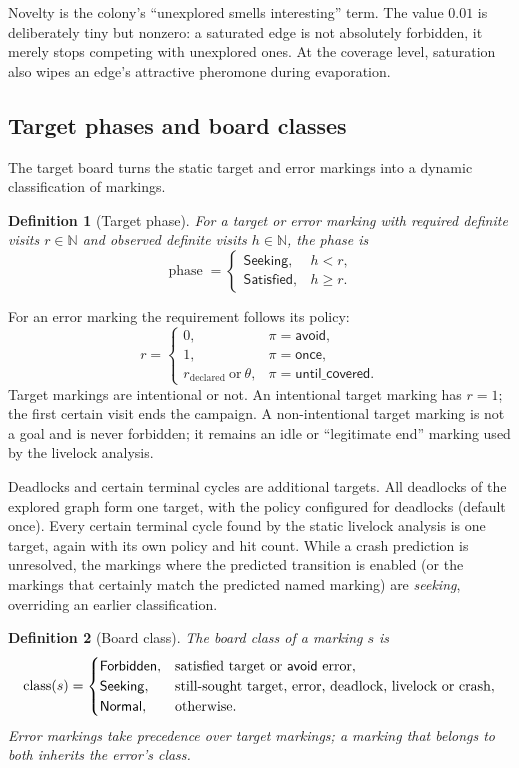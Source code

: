 \documentclass[11pt,a4paper]{article}
\newtheorem{definition}{Definition}[section]
\newcommand{\N}{\mathbb{N}}
\newcommand{\cls}{\operatorname{class}}
\begin{document}
Novelty is the colony's ``unexplored smells interesting'' term.  The value
$0.01$ is deliberately tiny but nonzero: a saturated edge is not absolutely
forbidden, it merely stops competing with unexplored ones.  At the coverage
level, saturation also wipes an edge's attractive pheromone during
evaporation.

\subsection{Target phases and board classes}\label{sec:targets}

The target board turns the static target and error markings into a dynamic
classification of markings.

\begin{definition}[Target phase]\label{def:phase}
For a target or error marking with required definite visits
$r\in\N$ and observed definite visits $h\in\N$, the phase is
\[
  \operatorname{phase}=
  \begin{cases}
    \mathsf{Seeking}, & h<r,\\
    \mathsf{Satisfied}, & h\ge r.
  \end{cases}
\]
\end{definition}

For an error marking the requirement follows its policy:
\[
  r=
  \begin{cases}
    0, & \pi=\mathsf{avoid},\\
    1, & \pi=\mathsf{once},\\
    r_{\text{declared}}\ \text{or}\ \theta, & \pi=\mathsf{until\_covered}.
  \end{cases}
\]
Target markings are intentional or not.  An intentional target marking has
$r=1$; the first certain visit ends the campaign.  A non-intentional target
marking is not a goal and is never forbidden; it remains an idle or
``legitimate end'' marking used by the livelock analysis.

Deadlocks and certain terminal cycles are additional targets.  All deadlocks
of the explored graph form one target, with the policy configured for
deadlocks (default \textsf{once}).  Every certain terminal cycle found by the
static livelock analysis is one target, again with its own policy and hit
count.  While a crash prediction is unresolved, the markings where the
predicted transition is enabled (or the markings that certainly match the
predicted named marking) are \emph{seeking}, overriding an earlier
classification.

\begin{definition}[Board class]\label{def:class}
The \emph{board class} of a marking $s$ is
\[
  \cls(s)=
  \begin{cases}
    \mathsf{Forbidden}, & \text{satisfied target or \textsf{avoid} error},\\
    \mathsf{Seeking}, & \text{still-sought target, error, deadlock,
                        livelock or crash},\\
    \mathsf{Normal}, & \text{otherwise}.
  \end{cases}
\]
Error markings take precedence over target markings; a marking that belongs
to both inherits the error's class.
\end{definition}
\end{document}
